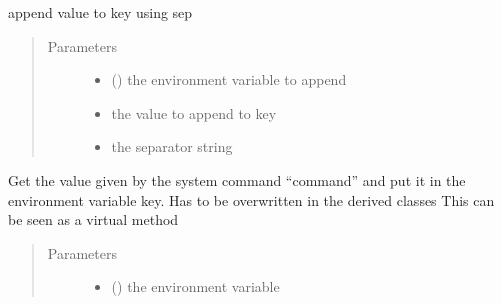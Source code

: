 \documentclass[a4paper,10pt,english]{sphinxmanual}
\begin{document}
\begin{fulllineitems}
\begin{fulllineitems}
\begin{quote}
\begin{description}
\begin{itemize}
\end{itemize}

\end{description}\end{quote}

\end{fulllineitems}


\begin{fulllineitems}
\label{\detokenize{commands/apidoc/src:src.fileEnviron.FileEnviron.append_value}}
append value to key using sep
\begin{quote}\begin{description}
\item[{Parameters}] \leavevmode\begin{itemize}
\item {} 
 () \textendash{} the environment variable to append

\item {} 
 \textendash{} the value to append to key

\item {} 
 \textendash{} the separator string

\end{itemize}

\end{description}\end{quote}

\end{fulllineitems}


\begin{fulllineitems}
\label{\detokenize{commands/apidoc/src:src.fileEnviron.FileEnviron.command_value}}
Get the value given by the system command “command” 
and put it in the environment variable key.
Has to be overwritten in the derived classes
This can be seen as a virtual method
\begin{quote}\begin{description}
\item[{Parameters}] \leavevmode\begin{itemize}
\item {} 
 () \textendash{} the environment variable


\end{itemize}
\end{description}
\end{quote}
\end{fulllineitems}
\end{fulllineitems}
\end{document}
